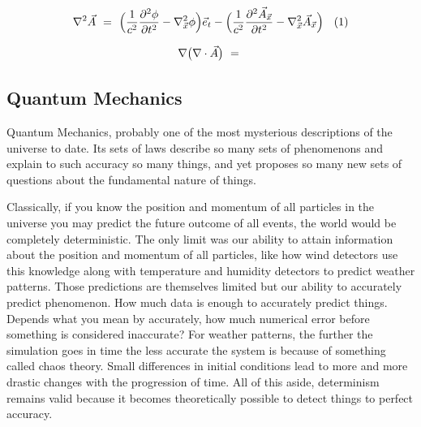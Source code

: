 \documentclass{article}
\begin{document}
\begin{equation} \label{eq:1002}
\nabla^2 \vec{A} \hspace{0.125cm} = \hspace{0.125cm} \Big( \frac{1}{c^2} \frac{\partial^2 {\phi}}{\partial{t}^2}  - \nabla_{\vec{x}}^2 \phi \Big) \vec{e}_t - \Big( \frac{1}{c^2} \frac{\partial^2 \vec{A}_{\vec{x}}}{\partial{t}^2} - \nabla_{\vec{x}}^2 \vec{A}_{\vec{x}} \Big) \hspace{0.325cm} (1) 
\end{equation}

\begin{equation} \label{eq:1002}
\nabla \big( \nabla \cdot \vec{A} \big) \hspace{0.125cm} = \hspace{0.125cm} 
\end{equation}








\subsection{Quantum Mechanics}

Quantum Mechanics, probably one of the most mysterious descriptions of the universe to date. Its sets of laws describe so many sets of phenomenons and explain to such accuracy so many things, and yet proposes so many new sets of questions about the fundamental nature of things. 

Classically, if you know the position and momentum of all particles in the universe you may predict the future outcome of all events, the world would be completely deterministic. The only limit was our ability to attain information about the position and momentum of all particles, like how wind detectors use this knowledge along with temperature and humidity detectors to predict weather patterns. Those predictions are themselves limited but our ability to accurately predict phenomenon. How much data is enough to accurately predict things. Depends what you mean by accurately, how much numerical error before something is considered inaccurate? For weather patterns, the further the simulation goes in time the less accurate the system is because of something called chaos theory. Small differences in initial conditions lead to more and more drastic changes with the progression of time. All of this aside, determinism remains valid because it becomes theoretically possible to detect things to perfect accuracy.
\end{document}
